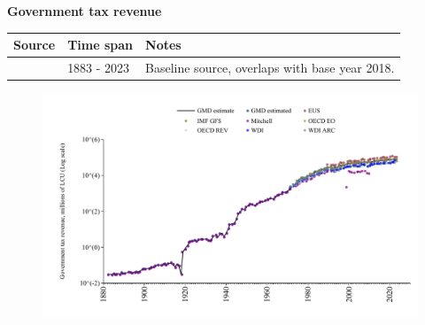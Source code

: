 \documentclass[12pt,a4paper,landscape]{article}
\begin{document}
\begin{adjustbox}{max totalsize={\paperwidth}{\paperheight},center}
\begin{minipage}[t][\textheight][t]{\textwidth}
\vspace*{0.5cm}
{}
\begin{center}
{\Large\bfseries Government tax revenue}
\end{center}
\vspace{0.5cm}
\begin{table}[H]
\centering
\small
\begin{tabular}{|l|l|l|}
\hline
\textbf{Source} & \textbf{Time span} & \textbf{Notes} \\
\hline
\rowcolor{white}\cite{GMD_estimated}& 1883 - 2023 &Baseline source, overlaps with base year 2018. \\
\hline
\end{tabular}
\end{table}
\begin{figure}[H]
\centering
\includegraphics[width=\textwidth,height=0.6\textheight,keepaspectratio]{graphs/FIN_govtax.pdf}
\end{figure}
\end{minipage}
\end{adjustbox}
\end{document}
